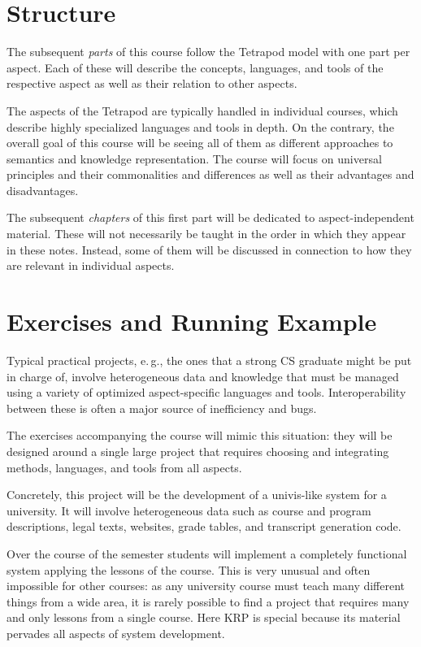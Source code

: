 \section{Structure}

The subsequent \emph{parts} of this course follow the Tetrapod model with one part per aspect.
Each of these will describe the concepts, languages, and tools of the respective aspect as well as their relation to other aspects.

The aspects of the Tetrapod are typically handled in individual courses, which describe highly specialized languages and tools in depth.
On the contrary, the overall goal of this course will be seeing all of them as different approaches to semantics and knowledge representation.
The course will focus on universal principles and their commonalities and differences as well as their advantages and disadvantages.

The subsequent \emph{chapters} of this first part will be dedicated to aspect-independent material.
These will not necessarily be taught in the order in which they appear in these notes.
Instead, some of them will be discussed in connection to how they are relevant in individual aspects.

\section{Exercises and Running Example}

Typical practical projects, e.\,g., the ones that a strong CS graduate might be put in charge of, involve heterogeneous data and knowledge that must be managed using a variety of optimized aspect-specific languages and tools.
Interoperability between these is often a major source of inefficiency and bugs.

The exercises accompanying the course will mimic this situation: they will be designed around a single large project that requires choosing and integrating methods, languages, and tools from all aspects.

Concretely, this project will be the development of a univis-like system for a university.
It will involve heterogeneous data such as course and program descriptions, legal texts, websites, grade tables, and transcript generation code.

Over the course of the semester students will implement a completely functional system applying the lessons of the course.
This is very unusual and often impossible for other courses: as any university course must teach many different things from a wide area, it is rarely possible to find a project that requires many and only lessons from a single course.
Here KRP is special because its material pervades all aspects of system development.


